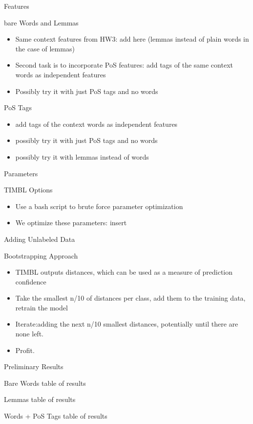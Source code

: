 \documentclass{beamer}
\begin{document}
	\begin{frame}{Features}
		\begin{block}{bare Words and Lemmas}
			\begin{itemize}
			\item Same context features from HW3: add here (lemmas instead of plain words in the case of lemmas)
			\item Second task is to incorporate PoS features: add tags of the same context words as independent features
			\item Possibly try it with just PoS tags and no words 
			\end{itemize}
		\end{block}
		\begin{block}{PoS Tags}
			\begin{itemize}
			\item add tags of the context words as independent features
			\item possibly try it with just PoS tags and no words 
			\item possibly try it with lemmas instead of words
			\end{itemize}
		\end{block}
	\end{frame}
	
	\begin{frame}{Parameters}
		\begin{block}{TIMBL Options}
			\begin{itemize}
			\item Use a bash script to brute force parameter optimization
			\item We optimize these parameters:  insert 
			\end{itemize}
		\end{block}
	\end{frame}
	
	\begin{frame}{Adding Unlabeled Data}
		\begin{block}{Bootstrapping Approach}
			\begin{itemize}
			\item TIMBL outputs distances, which can be used as a measure of prediction confidence
			\item Take the smallest n/10 of distances per class, add them to the training data, retrain the model
			\item Iterate:adding the next n/10 smallest distances, potentially until there are none left.  
			\item Profit.
			\end{itemize}
		\end{block}
	\end{frame}
	
	\begin{frame}{Preliminary Results}
		\begin{block}{Bare Words}
			table of results
		\end{block}
		\begin{block}{Lemmas}
			table of results
		\end{block}
		\begin{block}{Words + PoS Tags}
			table of results
		\end{block}
	\end{frame}
	
\end{document}
